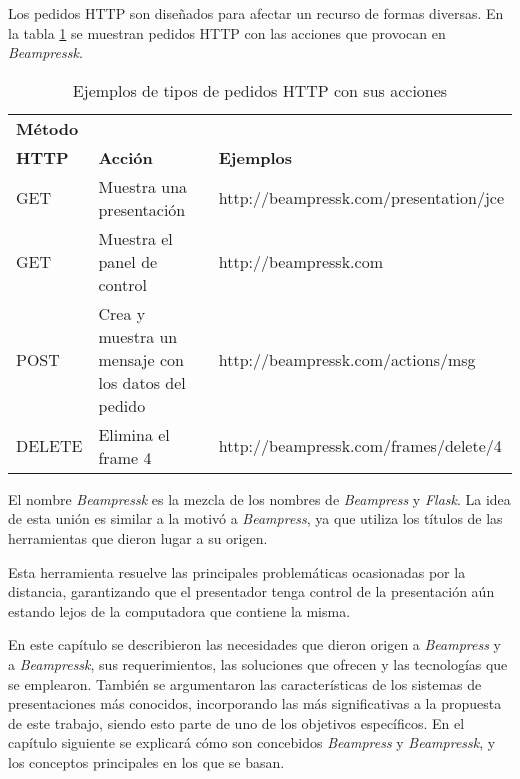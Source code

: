 			Los pedidos HTTP son diseñados para afectar un recurso de formas diversas. En la tabla \ref{tab:request} se muestran pedidos HTTP con las acciones que provocan en \textit{Beampressk}.

			\begin{table}[b]
				\caption{Ejemplos de tipos de pedidos HTTP con sus acciones}
				\label{tab:request}
				\centering
			
				\begin{tabular}{| l | p{4.25cm} | p{6.75cm} |}
				\hline
			
				\hline
				\textbf{Método} & & \\ 
				\textbf{HTTP} & \textbf{Acción} & \textbf{Ejemplos} \\
				\hline
					GET & Muestra una presentación &  http://beampressk.com/presentation/jce \\ 
				\hline

				\hline
					GET & Muestra el panel de control &  http://beampressk.com \\ 
				\hline

				\hline
					POST & Crea y muestra un mensaje con los datos del pedido &  http://beampressk.com/actions/msg \\ 
				\hline

				\hline
					DELETE & Elimina el frame 4 &  http://beampressk.com/frames/delete/4 \\ 
				\hline										
			
				\hline
				\end{tabular}
			\end{table}		

		El nombre \textit{Beampressk} es la mezcla de los nombres de \textit{Beampress} y \textit{Flask}. La idea de esta unión es similar a la motivó a \textit{Beampress}, ya que utiliza los títulos de las herramientas que dieron lugar a su origen.

		Esta herramienta resuelve las principales problemáticas ocasionadas por la distancia, garantizando que el presentador tenga control de la presentación aún estando lejos de la computadora que contiene la misma.


		En este capítulo se describieron las necesidades que dieron origen a \textit{Beampress} y a \textit{Beampressk}, sus requerimientos, las soluciones que ofrecen y las tecnologías que se emplearon. También se argumentaron las características de los sistemas de presentaciones más conocidos, incorporando las más significativas a la propuesta de este trabajo, siendo esto parte de uno de los objetivos específicos. En el capítulo siguiente se explicará cómo son concebidos \textit{Beampress} y \textit{Beampressk}, y los conceptos principales en los que se basan.






